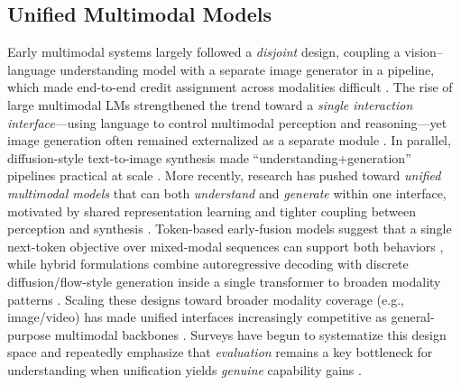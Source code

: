 \documentclass{article}
\theoremstyle{plain}
\theoremstyle{definition}
\theoremstyle{remark}
\begin{document}
\subsection{Unified Multimodal Models}
Early multimodal systems largely followed a \emph{disjoint} design, coupling a vision--language understanding model with a separate image generator in a pipeline, which made end-to-end credit assignment across modalities difficult \citep{alayrac2022flamingo,li2023blip2,danet_2025,past_2025}.
The rise of large multimodal LMs strengthened the trend toward a \emph{single interaction interface}---using language to control multimodal perception and reasoning---yet image generation often remained externalized as a separate module \citep{huang2023kosmos1}.
In parallel, diffusion-style text-to-image synthesis made ``understanding+generation'' pipelines practical at scale \citep{rombach2022ldm}.
More recently, research has pushed toward \emph{unified multimodal models} that can both \emph{understand} and \emph{generate} within one interface, motivated by shared representation learning and tighter coupling between perception and synthesis \citep{team2024chameleon,xie2024showo}.
Token-based early-fusion models suggest that a single next-token objective over mixed-modal sequences can support both behaviors \citep{team2024chameleon}, while hybrid formulations combine autoregressive decoding with discrete diffusion/flow-style generation inside a single transformer to broaden modality patterns \citep{xie2024showo}.
Scaling these designs toward broader modality coverage (e.g., image/video) has made unified interfaces increasingly competitive as general-purpose multimodal backbones \citep{xie2025showo2,deng2025bagel,chen2025januspro,ipr1_2025}.
Surveys have begun to systematize this design space and repeatedly emphasize that \emph{evaluation} remains a key bottleneck for understanding when unification yields \emph{genuine} capability gains \citep{yang2025survey,zhao2025unifiedsurvey}.
\end{document}
